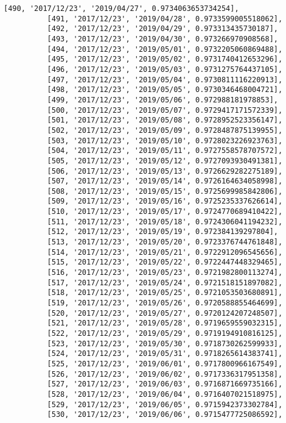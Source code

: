 \documentclass[11pt]{article}
\begin{document}
\begin{Verbatim}[commandchars=\\\{\}]
          [490, '2017/12/23', '2019/04/27', 0.9734063653734254],
          [491, '2017/12/23', '2019/04/28', 0.9733599005518062],
          [492, '2017/12/23', '2019/04/29', 0.973313435730187],
          [493, '2017/12/23', '2019/04/30', 0.973266970908568],
          [494, '2017/12/23', '2019/05/01', 0.9732205060869488],
          [495, '2017/12/23', '2019/05/02', 0.9731740412653296],
          [496, '2017/12/23', '2019/05/03', 0.9731275764437105],
          [497, '2017/12/23', '2019/05/04', 0.9730811116220913],
          [498, '2017/12/23', '2019/05/05', 0.9730346468004721],
          [499, '2017/12/23', '2019/05/06', 0.972988181978853],
          [500, '2017/12/23', '2019/05/07', 0.9729417171572339],
          [501, '2017/12/23', '2019/05/08', 0.9728952523356147],
          [502, '2017/12/23', '2019/05/09', 0.9728487875139955],
          [503, '2017/12/23', '2019/05/10', 0.9728023226923763],
          [504, '2017/12/23', '2019/05/11', 0.9727558578707572],
          [505, '2017/12/23', '2019/05/12', 0.9727093930491381],
          [506, '2017/12/23', '2019/05/13', 0.9726629282275189],
          [507, '2017/12/23', '2019/05/14', 0.9726164634058998],
          [508, '2017/12/23', '2019/05/15', 0.9725699985842806],
          [509, '2017/12/23', '2019/05/16', 0.9725235337626614],
          [510, '2017/12/23', '2019/05/17', 0.9724770689410422],
          [511, '2017/12/23', '2019/05/18', 0.9724306041194232],
          [512, '2017/12/23', '2019/05/19', 0.972384139297804],
          [513, '2017/12/23', '2019/05/20', 0.9723376744761848],
          [514, '2017/12/23', '2019/05/21', 0.9722912096545656],
          [515, '2017/12/23', '2019/05/22', 0.9722447448329465],
          [516, '2017/12/23', '2019/05/23', 0.9721982800113274],
          [517, '2017/12/23', '2019/05/24', 0.9721518151897082],
          [518, '2017/12/23', '2019/05/25', 0.9721053503680891],
          [519, '2017/12/23', '2019/05/26', 0.9720588855464699],
          [520, '2017/12/23', '2019/05/27', 0.9720124207248507],
          [521, '2017/12/23', '2019/05/28', 0.9719659559032315],
          [522, '2017/12/23', '2019/05/29', 0.9719194910816125],
          [523, '2017/12/23', '2019/05/30', 0.9718730262599933],
          [524, '2017/12/23', '2019/05/31', 0.9718265614383741],
          [525, '2017/12/23', '2019/06/01', 0.9717800966167549],
          [526, '2017/12/23', '2019/06/02', 0.9717336317951358],
          [527, '2017/12/23', '2019/06/03', 0.9716871669735166],
          [528, '2017/12/23', '2019/06/04', 0.9716407021518975],
          [529, '2017/12/23', '2019/06/05', 0.9715942373302784],
          [530, '2017/12/23', '2019/06/06', 0.9715477725086592],

\end{Verbatim}
\end{document}
